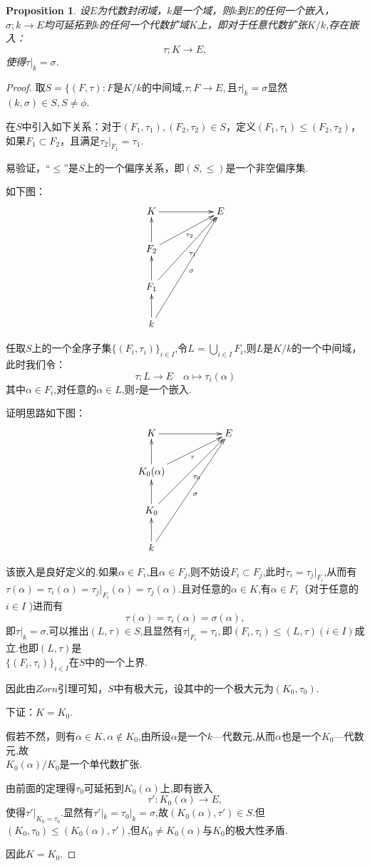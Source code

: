 \documentclass[UTF8]{article}
\newtheorem{prop}{Proposition}[section]
\begin{document}
\begin{prop}
设$E$为代数封闭域，$k$是一个域，则$k$到$E$的任何一个嵌入，$\sigma; k\rightarrow E$均可延拓到$k$的任何一个代数扩域$K$上，即对于任意代数扩张$K/k$,存在嵌入：$$\tau ;K\rightarrow E,$$使得$\tau |_k=\sigma$.
\end{prop}
\begin{proof}
取$S=\{(F,\tau):F$是$K/k$的中间域,$\tau ;F\rightarrow E,$且$\tau |_k=\sigma$显然$(k,\sigma)\in S,S\ne \phi $.

在$S$中引入如下关系：对于$(F_1,\tau_1),(F_2,\tau_2)\in S$，定义$(F_1,\tau_1)\le (F_2,\tau_2)$，如果$F_1\subset F_2$，且满足$\tau_2|_{F_1}=\tau_1$.

易验证，“$\le $”是$S$上的一个偏序关系，即$(S,\le)$是一个非空偏序集.

如下图：$$\xymatrix{K\ar[rr]&&{E}\\F_2 \ar[u] \ar[rru]_{\tau_2} && \\F_1 \ar[u] \ar[rruu]_{\tau_1} && \\k\ar[u] \ar[rruuu]_{\sigma} &&} $$

任取$S$上的一个全序子集$\{(F_i,\tau_i)\}_{i\in I}$,令$L=\bigcup_{i\in I}F_{i}$,则$L$是$K/k$的一个中间域，此时我们令：$$\tau ;L\rightarrow E \quad \alpha\longmapsto \tau_i(\alpha)$$其中$\alpha\in F_i$,对任意的$\alpha\in L$,则$\tau$是一个嵌入.

证明思路如下图：$$\xymatrix{K\ar[rr]&&{E}\\K_0(\alpha)\ar[u] \ar[rru]_{\tau} && \\K_0 \ar[u] \ar[rruu]_{\tau_0} && \\k\ar[u] \ar[rruuu]_{\sigma} &&} $$

该嵌入是良好定义的.如果$\alpha\in F_i$,且$\alpha\in F_j$,则不妨设$F_i\subset F_j$,此时$\tau_i=\tau_j|_{F_i}$,从而有$\tau(\alpha)=\tau_i(\alpha)=\tau_j|_{F_i}(\alpha)=\tau_j(\alpha).$且对任意的$\alpha\in K$,有$\alpha\in F_i$（对于任意的$i\in I$ )进而有$$\tau(\alpha)=\tau_i(\alpha)=\sigma(\alpha),$$即$\tau |_k=\sigma$.可以推出$(L,\tau)\in S$,且显然有$\tau |_{F_i}=\tau_i,$即$(F_i,\tau_i)\le(L,\tau)(i\in I) $成立.也即$(L,\tau)$是\\$\{(F_i,\tau_i)\}_{i\in I}$在$S$中的一个上界.

因此由$Zorn$引理可知，$S$中有极大元，设其中的一个极大元为$(K_0,\tau_0).$

下证：$K=K_0.$

假若不然，则有$\alpha\in K,\alpha\notin K_0$,由所设$\alpha$是一个$k$—代数元,从而$\alpha$也是一个$K_0$—代数元,故\\$K_0(\alpha)/K_0$是一个单代数扩张.

由前面的定理得$\tau_0$可延拓到$K_0(\alpha)$上,即有嵌入$$\tau':K_0(\alpha)\rightarrow E,$$使得$\tau'|_{K_0=\tau_0}.$显然有$\tau'|_k=\tau_0|_k=\sigma$,故$(K_0(\alpha),\tau')\in S$.但$(K_0,\tau_0)\le(K_0(\alpha),\tau')$,但$K_0\ne K_0(\alpha)$与$K_0$的极大性矛盾.

因此$K=K_0.$
\end{proof}
\end{document}
